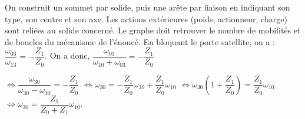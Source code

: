 \begin{corrigebox}
On construit un sommet par solide, puis une arête par liaison en
        indiquant son type, son centre et son axe. Les actions extérieures (poids,
        actionneur, charge) sont reliées au solide concerné. Le graphe doit retrouver le
        nombre de mobilités et de boucles du mécanisme de l'énoncé.
En bloquant le porte satellite, on a : $\dfrac{\omega_{03}}{\omega_{13}}=-\dfrac{Z_1}{Z_0}$. On a donc, 
$\dfrac{\omega_{03}}{\omega_{10}+\omega_{03}}=-\dfrac{Z_1}{Z_0}$

$\Leftrightarrow \dfrac{\omega_{30}}{\omega_{30}-\omega_{10}}=-\dfrac{Z_1}{Z_0}$
$\Leftrightarrow \omega_{30}=-\dfrac{Z_1}{Z_0} \omega_{30}+\dfrac{Z_1}{Z_0}\omega_{10} $
$\Leftrightarrow \omega_{30}\left( 1+\dfrac{Z_1}{Z_0} \right)=\dfrac{Z_1}{Z_0}\omega_{10} $
$\Leftrightarrow \omega_{30}=\dfrac{Z_1}{Z_0+Z_1}\omega_{10} $.
\end{corrigebox}
